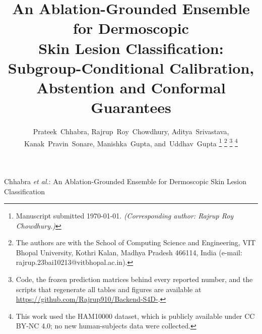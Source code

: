 \documentclass[journal]{IEEEtran}
\begin{document}
\title{An Ablation-Grounded Ensemble for Dermoscopic\\ Skin Lesion Classification:
Subgroup-Conditional Calibration, Abstention and Conformal Guarantees}

\author{Prateek~Chhabra,
        Rajrup~Roy~Chowdhury,
        Aditya~Srivastava,
        Kanak~Pravin~Sonare,
        Manishka~Gupta,
        and~Uddhav~Gupta%
\thanks{Manuscript submitted \today. \emph{(Corresponding author: Rajrup Roy Chowdhury.)}}%
\thanks{The authors are with the School of Computing Science and Engineering,
VIT Bhopal University, Kothri Kalan, Madhya Pradesh 466114, India
(e-mail: rajrup.23bai10213@vitbhopal.ac.in).}%
\thanks{Code, the frozen prediction matrices behind every reported number, and the scripts
that regenerate all tables and figures are available at
\url{https://github.com/Rajrup910/Backend-S4D-}.}%
\thanks{This work used the HAM10000 dataset, which is publicly available under CC BY-NC 4.0;
no new human-subjects data were collected.}}

%
{Chhabra \MakeLowercase{\textit{et al.}}: An Ablation-Grounded Ensemble for Dermoscopic Skin Lesion Classification}

\maketitle
\end{document}

